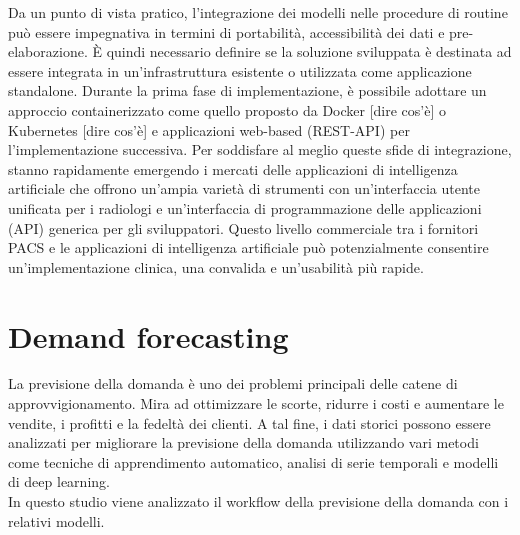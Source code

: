 \documentclass[12pt,a4paper]{report}
\begin{document}
Da un punto di vista pratico, l'integrazione dei modelli nelle procedure di routine può essere impegnativa in termini di portabilità, accessibilità dei dati e pre-elaborazione. È quindi necessario definire se la soluzione sviluppata è destinata ad essere integrata in un'infrastruttura esistente o utilizzata come applicazione standalone. Durante la prima fase di implementazione, è possibile adottare un approccio containerizzato come quello proposto da Docker [dire cos'è] o Kubernetes [dire cos'è] e applicazioni web-based (REST-API) per l'implementazione successiva.
Per soddisfare al meglio queste sfide di integrazione, stanno rapidamente emergendo i mercati delle applicazioni di intelligenza artificiale che offrono un'ampia varietà di strumenti con un'interfaccia utente unificata per i radiologi e un'interfaccia di programmazione delle applicazioni (API) generica per gli sviluppatori. Questo livello commerciale tra i fornitori PACS e le applicazioni di intelligenza artificiale può potenzialmente consentire un'implementazione clinica, una convalida e un'usabilità più rapide. \cite{montagnon2020deep}

\chapter{Demand forecasting}
La previsione della domanda è uno dei problemi principali delle catene di approvvigionamento. Mira ad ottimizzare le scorte, ridurre i costi e aumentare le vendite, i profitti e la fedeltà dei clienti. A tal fine, i dati storici possono essere analizzati per migliorare la previsione della domanda utilizzando vari metodi come tecniche di apprendimento automatico, analisi di serie temporali e modelli di deep learning.\\
In questo studio viene analizzato il workflow della previsione della domanda con i relativi modelli. 
\end{document}
